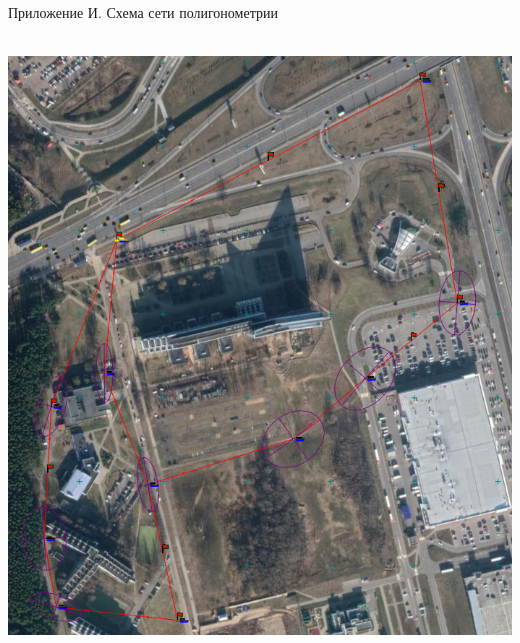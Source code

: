 \documentclass[a4paper]{article}
\begin{document}
\begin{newpage}

        \begin{center}
            \begin{flushright}
                Приложение И. Схема сети полигонометрии
            \end{flushright}
            ~\\
            \includegraphics[scale=1]{shema.png}
        \end{center}

\end{newpage}
\end{document}
